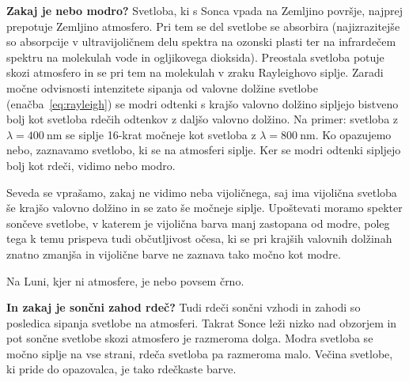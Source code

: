 \begin{example}{\bf Zakaj je nebo modro?}
Svetloba, ki s Sonca vpada na Zemljino površje, najprej prepotuje Zemljino atmosfero.
Pri tem se del svetlobe se absorbira (najizrazitejše so absorpcije v ultravijoličnem delu 
spektra na ozonski plasti ter na infrardečem spektru na molekulah vode in ogljikovega 
dioksida). Preostala svetloba potuje skozi atmosfero in se pri tem na molekulah v zraku
Rayleighovo siplje. Zaradi močne odvisnosti intenzitete sipanja od valovne dolžine svetlobe 
(enačba~\ref{eq:rayleigh}) se modri odtenki s krajšo valovno dolžino sipljejo bistveno bolj 
kot svetloba rdečih odtenkov z daljšo valovno dolžino. Na primer: svetloba z 
$\lambda = 400~\si{\nm}$ se siplje 16-krat močneje kot svetloba z $\lambda = 800~\si{\nm}$.
Ko opazujemo nebo, zaznavamo svetlobo, ki se na atmosferi siplje. Ker se modri odtenki sipljejo
bolj kot rdeči, vidimo nebo modro. 

Seveda se vprašamo, zakaj ne vidimo neba vijoličnega, saj 
ima vijolična svetloba še krajšo valovno dolžino in se zato še močneje siplje. Upoštevati 
moramo spekter sončeve svetlobe, v katerem je vijolična barva manj zastopana od modre, poleg
tega k temu prispeva tudi občutljivost očesa, ki se pri krajših valovnih dolžinah znatno 
zmanjša in vijolične barve ne zaznava tako močno kot modre. 

Na Luni, kjer ni atmosfere, je nebo povsem črno.
\end{example}

\begin{example}{\bf In zakaj je sončni zahod rdeč?}
Tudi rdeči sončni vzhodi in zahodi so posledica sipanja svetlobe na atmosferi. Takrat Sonce
leži nizko nad obzorjem in pot sončne svetlobe skozi atmosfero je razmeroma dolga.
Modra svetloba se močno siplje na vse strani, rdeča svetloba pa razmeroma malo. Večina
svetlobe, ki pride do opazovalca, je tako rdečkaste barve.
\end{example}

